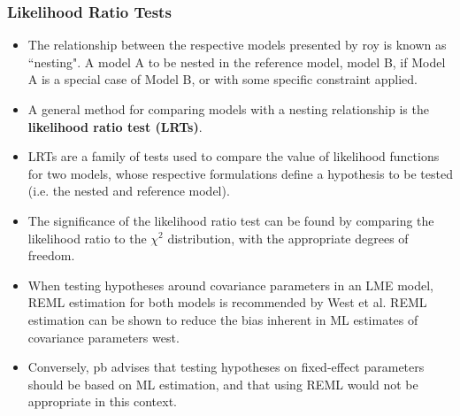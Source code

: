 \documentclass[compress]{beamer}        %
\begin{document}
\begin{frame}
\frametitle{Likelihood Ratio Tests}
\begin{itemize}
\item The relationship between the respective models presented by \alert{roy} is known as ``nesting".
A model A to be nested in the reference model, model B, if Model A is a special case of Model B, or with some specific constraint applied.
\item 
A general method for comparing models with a nesting relationship is the \textbf{likelihood ratio test (LRTs)}. 
\item LRTs are a family of tests used to compare the value of likelihood functions for two models, whose respective formulations define a hypothesis to be tested (i.e. the nested and reference model). 
\item The significance of the likelihood ratio test can be found by comparing the likelihood ratio to the $\chi^2$ distribution, with the appropriate degrees of freedom.
\end{itemize}
\end{frame}
\begin{frame}
\begin{itemize}
\item When testing hypotheses around covariance parameters in an LME model, REML estimation for both models is recommended by West et al. REML estimation can be shown to reduce the bias inherent in ML estimates of covariance parameters \alert{west}.
\item Conversely, \alert{pb} advises that testing hypotheses on fixed-effect parameters should be based on ML estimation, and that using REML would not be appropriate in this context.
\end{itemize}
\end{frame}
\end{document}
